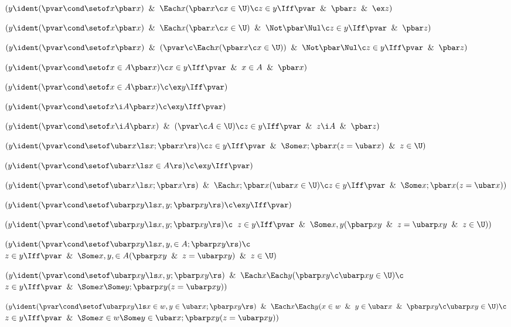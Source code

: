  $(y \ident (\pvar \cond \setof x \pbar x) 
	 \And \Each x(\pbar x \c x \in \U)
	\c z \in y \Iff \pvar \And \pbar z \And \ex z)$

 $(y \ident (\pvar \cond \setof x \pbar x) \And 
	\Each x(\pbar x \c x \in \U) \And \Not \pbar \Nul 
	\c z \in y \Iff \pvar \And \pbar z)$

 $(y \ident (\pvar \cond \setof x \pbar x) \And 
	(\pvar \c \Each x(\pbar x \c x \in \U)) \And \Not \pbar \Nul 
	\c z \in y \Iff \pvar \And \pbar z)$

 $(y \ident (\pvar \cond \setof x \in A\pbar x)
\c x \in y \Iff \pvar \And x \in A \And \pbar x)$

 $(y \ident (\pvar \cond\setof x \in A\pbar x)
\c \ex y \Iff \pvar)$


 $(y \ident (\pvar \cond \setof x \i A \pbar x)
\c \ex y \Iff \pvar)$

 $(y \ident (\pvar \cond \setof x \i A \pbar x)
\And (\pvar \c A \in \U) \c z \in y \Iff 
\pvar \And z \i A \And \pbar z)$


 $(y \ident(\pvar\cond\setof\ubar x \ls x;\pbar x\rs)
\c z \in y\Iff\pvar\And\Some x;\pbar x(z=\ubar x)\And z \in \U)$

 $(y \ident (\pvar \cond 
\setof \ubar x \ls x\in A\rs) \c \ex y\Iff\pvar)$

 $(y \ident (\pvar \cond \setof \ubar x \ls x;\pbar x\rs) \And
	\Each x;\pbar x(\ubar x \in \U)
	\c z \in y \Iff \pvar \And \Some x;\pbar x(z=\ubar x))$

 $(y\ident (\pvar \cond \setof \ubarp xy 
\ls x,y;\pbarp xy\rs) \c \ex y \Iff \pvar)$

 $(y\ident (\pvar \cond\setof \ubarp xy 
\ls x,y;\pbarp xy\rs) \c $
 $z \in y \Iff \pvar\And 
\Some x,y(\pbarp xy \And z = \ubarp xy \And z \in \U))$

 $(y\ident (\pvar \cond\setof \ubarp xy 
\ls x,y, \in A;\pbarp xy\rs) \c $
 $z \in y \Iff \pvar\And 
\Some x,y, \in A(\pbarp xy \And z = \ubarp xy )\And z \in \U)$

 $(y\ident (\pvar \cond\setof \ubarp xy 
\ls x ,y ;\pbarp xy\rs) \And
\Each x  \Each y ( \pbarp xy \c \ubarp xy \in \U) \c $
\lineb $z \in y \Iff \pvar\And 
\Some x  \Some y;\pbarp xy (z = \ubarp xy ))$

 $(y\ident (\pvar \cond\setof \ubarp xy 
\ls x \in w,y \in \ubar x;\pbarp xy\rs) \And
\Each x  \Each y (x \in w \And y \in \ubar x \And \pbarp xy \c \ubarp xy \in \U) \c $
\lineb $z \in y \Iff \pvar\And 
\Some x \in w \Some y\in \ubar x;\pbarp xy (z = \ubarp xy ))$
	\lineb



